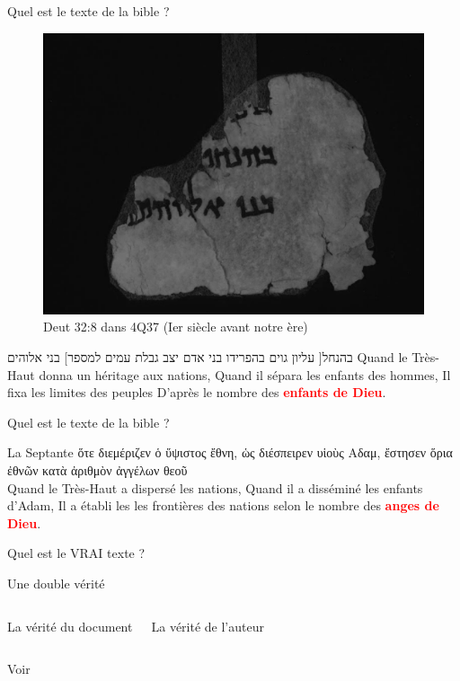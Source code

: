 \documentclass[11pt]{beamer}
\begin{document}
\begin{frame}{Quel est le texte de la bible ?}
    \begin{figure}
        \centering
        \includegraphics[width=.5\linewidth]{img/4Q37_12_deut_32_8.png}
        \caption{Deut 32:8 dans 4Q37 (Ier siècle avant notre ère)}
    \end{figure}
    \begin{alertblock}{\RTL \texthebrew{בהנחל[ עליון גוים בהפרידו בני אדם יצב גבלת עמים למספר] בני אלוהים}}
        Quand le Très-Haut donna un héritage aux nations, Quand il sépara les enfants des hommes, Il fixa les limites des peuples D'après le nombre des \textbf{\textcolor{red}{enfants de Dieu}}.
    \end{alertblock}
\end{frame}

\begin{frame}{Quel est le texte de la bible ?}
    \begin{alertblock}{La Septante}
        \textgreek{ὅτε διεμέριζεν ὁ ὕψιστος ἔθνη, ὡς διέσπειρεν υἱοὺς Αδαμ, ἔστησεν ὅρια ἐθνῶν κατὰ ἀριθμὸν ἀγγέλων θεοῦ}\\
        
        Quand le Très-Haut a dispersé les nations, Quand il a disséminé les enfants d'Adam, Il a établi les les frontières des nations selon le nombre des \textbf{\textcolor{red}{anges de Dieu}}.
    \end{alertblock}
\end{frame}

\begin{frame}{Quel est le VRAI texte ?}
\begin{block}{Une double vérité}
\pause
\begin{columns}
        \centering
        \begin{alertblock}{}
        \centering La vérité du document
        \end{alertblock}
        \centering
        \begin{exampleblock}{}
        \centering La vérité de l'auteur
        \end{exampleblock}
\end{columns}
\end{block}
\tiny{Voir }
\end{frame}
\end{document}
